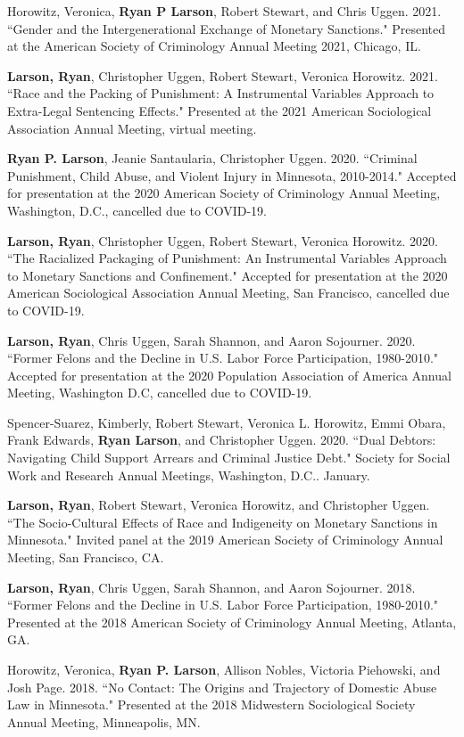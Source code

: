 \documentclass[letterpaper]{article}
\renewenvironment{itemize}{
  \begin{list}{}{
    \setlength{\leftmargin}{1.5em}
  }
}{
  \end{list}
}
\begin{document}
\begin{itemize}
\item Horowitz, Veronica, \textbf{Ryan P Larson}, Robert Stewart, and Chris Uggen. 2021. ``Gender and the Intergenerational Exchange of Monetary Sanctions." Presented at the American Society of Criminology Annual Meeting 2021, Chicago, IL. 
\item \textbf{Larson, Ryan}, Christopher Uggen, Robert Stewart, Veronica Horowitz. 2021. ``Race and the Packing of Punishment: A Instrumental Variables Approach to Extra-Legal Sentencing Effects." Presented at the 2021 American Sociological Association Annual Meeting, virtual meeting. 
\item \textbf{Ryan P. Larson}, Jeanie Santaularia, Christopher Uggen. 2020. ``Criminal Punishment, Child Abuse, and Violent Injury in Minnesota, 2010-2014." Accepted for presentation at the 2020 American Society of Criminology Annual Meeting, Washington, D.C., cancelled due to COVID-19.  
\item \textbf{Larson, Ryan}, Christopher Uggen, Robert Stewart, Veronica Horowitz. 2020. ``The Racialized Packaging of Punishment: An Instrumental Variables Approach to Monetary Sanctions and Confinement." Accepted for presentation at the 2020 American Sociological Association Annual Meeting, San Francisco, cancelled due to COVID-19. 
\item \textbf{Larson, Ryan}, Chris Uggen, Sarah Shannon, and Aaron Sojourner. 2020. ``Former Felons and the Decline in U.S. Labor Force Participation, 1980-2010." Accepted for presentation at the 2020 Population Association of America Annual Meeting, Washington D.C, cancelled due to COVID-19. 
\item Spencer-Suarez, Kimberly, Robert Stewart, Veronica L. Horowitz, Emmi Obara, Frank Edwards, \textbf{Ryan Larson}, and Christopher Uggen. 2020. ``Dual Debtors: Navigating Child Support Arrears and Criminal Justice Debt." Society for Social Work and Research Annual Meetings, Washington, D.C.. January.
\item \textbf{Larson, Ryan}, Robert Stewart, Veronica Horowitz, and Christopher Uggen. ``The Socio-Cultural Effects of Race and Indigeneity on Monetary Sanctions in Minnesota." Invited panel at the 2019 American Society of Criminology Annual Meeting, San Francisco, CA.
\item \textbf{Larson, Ryan}, Chris Uggen, Sarah Shannon, and Aaron Sojourner. 2018. ``Former Felons and the Decline in U.S. Labor Force Participation, 1980-2010." Presented at the 2018 American Society of Criminology Annual Meeting, Atlanta, GA. 
\item Horowitz, Veronica, \textbf{Ryan P. Larson}, Allison Nobles, Victoria Piehowski, and Josh Page.  2018. ``No Contact: The Origins and Trajectory of Domestic Abuse Law in Minnesota." Presented at the 2018 Midwestern Sociological Society Annual Meeting, Minneapolis, MN. 

\end{itemize}
\end{document}
